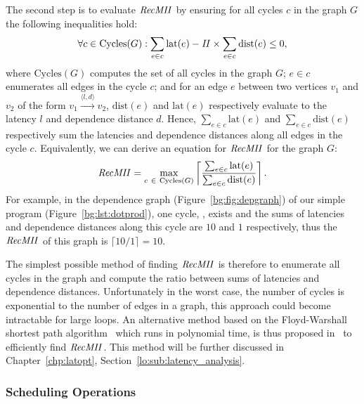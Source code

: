The second step is to evaluate $\mathit{RecMII}$ by ensuring for all cycles $c$ in the
graph $G$ the following inequalities hold:
\begin{equation}
    \forall c \in \mathrm{Cycles}(G):
        \sum_{e \in c} \mathrm{lat}(e) - \mathit{II} \times
        \sum_{e \in c} \mathrm{dist}(e) \leq 0,
\end{equation}
where $\mathrm{Cycles}(G)$ computes the set of all cycles in the graph $G$;
$e \in c$ enumerates all edges in the cycle $c$; and for an edge $e$ between
two vertices $v_1$ and $v_2$ of the form $v_1 \xrightarrow{\langle l, d
\rangle} v_2$, $\mathrm{dist}(e)$ and $\mathrm{lat}(e)$ respectively evaluate
to the latency $l$ and dependence distance $d$.  Hence, $\sum_{e \in c}
\mathrm{lat}(e)$ and $\sum_{e \in c} \mathrm{dist}(e)$ respectively sum
the latencies and dependence distances along all edges in the cycle $c$.
Equivalently, we can derive an equation for $\mathit{RecMII}$ for the graph $G$:
\begin{equation}
    \RecMII = \max_{c~\in~\mathrm{Cycles}(G)}
        \left\lceil \frac{%
            \sum_{e \in c} \mathrm{lat}(e)
        }{%
            \sum_{e \in c} \mathrm{dist}(e)
        }
        \right\rceil.
\end{equation}
For example, in the dependence graph (Figure~\ref{bg:fig:depgraph}) of our
simple program (Figure~\ref{bg:lst:dotprod}), one cycle,
,
exists and the sums of latencies and dependence distances along this cycle are
$10$ and $1$ respectively, thus the $\mathit{RecMII}$ of this graph is $\lceil 10 / 1
\rceil = 10$.

The simplest possible method of finding $\mathit{RecMII}$ is therefore to enumerate
all cycles in the graph and compute the ratio between sums of latencies
and dependence distances.  Unfortunately in the worst case, the number of
cycles is exponential to the number of edges in a graph, this approach
could become intractable for large loops.  An alternative method based
on the Floyd-Warshall shortest path algorithm~\cite{floyd62} which runs
in polynomial time, is thus proposed in~\cite{rau94} to efficiently find
$\mathit{RecMII}$.  This method will be further discussed in Chapter~\ref{chp:latopt},
Section~\ref{lo:sub:latency_analysis}.

\subsubsection{Scheduling Operations}

